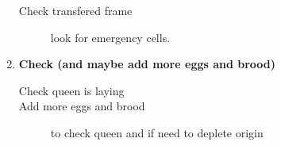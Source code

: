 \begin{enumerate}
\begin{description}
  \item[Check transfered frame] look for emergency cells.
\end{description}

\item \textbf{Check (and maybe add more eggs and brood)}

\begin{description}
  \item[Check queen is laying] 
  \item[Add more eggs and brood] to check queen and if need to deplete origin
\end{description}

\end{enumerate}




